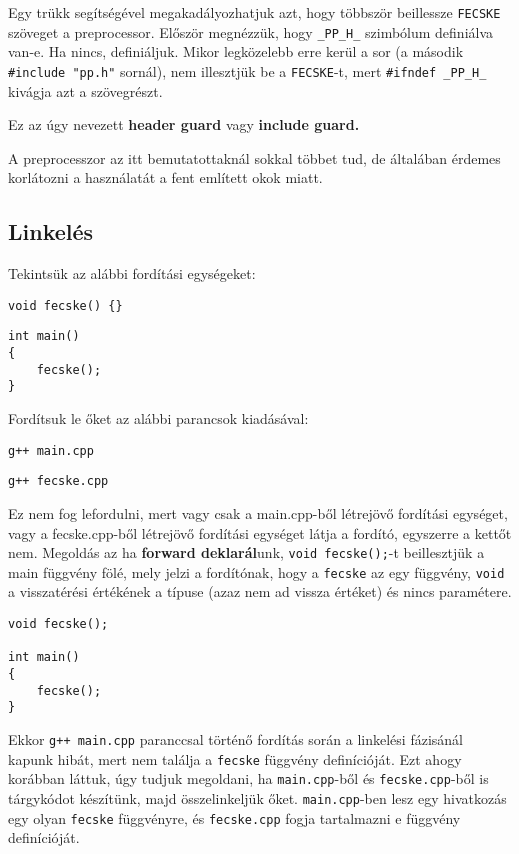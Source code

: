 \documentclass[a4paper,11.5pt,table]{article}
\begin{document}
	Egy trükk segítségével megakadályozhatjuk azt, hogy többször beillessze \texttt{FECSKE} szöveget a preprocessor. Először megnézzük, hogy \texttt{\_PP\_H\_} szimbólum definiálva van-e. Ha nincs, definiáljuk. Mikor legközelebb erre kerül a sor (a második \texttt{\#include "pp.h"} sornál), nem illesztjük be a \texttt{FECSKE}-t, mert \texttt{\#ifndef \_PP\_H\_} kivágja azt a szövegrészt.
	
	Ez az úgy nevezett \textbf{header guard} vagy \textbf{include guard.}
	
	\medskip
	A preprocesszor az itt bemutatottaknál sokkal többet tud, de általában érdemes korlátozni a használatát a fent említett okok miatt.
	
	\subsection{Linkelés}
	Tekintsük az alábbi fordítási egységeket:
	
	\smallskip
	\begin{lstlisting}
void fecske() {}
	\end{lstlisting}
	
	\smallskip
	\begin{lstlisting}
int main()
{
	fecske();
}
	\end{lstlisting}
	Fordítsuk le őket az alábbi parancsok kiadásával:
	
	{\centering\texttt{g++ main.cpp}\par}
	
	{\centering\texttt{g++ fecske.cpp}\par}
	
	Ez nem fog lefordulni, mert vagy csak a main.cpp-ből létrejövő fordítási egységet, vagy a fecske.cpp-ből létrejövő fordítási egységet látja a fordító, egyszerre a kettőt nem. Megoldás az ha \textbf{forward deklarál}unk, \texttt{void fecske();}-t beillesztjük a main függvény fölé, mely jelzi a fordítónak, hogy a \texttt{fecske} az egy függvény, \texttt{void} a visszatérési értékének a típuse (azaz nem ad vissza értéket) és nincs paramétere. 
	
	\smallskip
	\begin{lstlisting}
void fecske();

int main()
{
	fecske();
}
	\end{lstlisting}
	Ekkor \texttt{g++ main.cpp} paranccsal történő fordítás során a linkelési fázisánál kapunk hibát, mert nem találja a \texttt{fecske} függvény definícióját. Ezt ahogy korábban láttuk, úgy tudjuk megoldani, ha \texttt{main.cpp}-ből és \texttt{fecske.cpp}-ből is tárgykódot készítünk, majd összelinkeljük őket. \texttt{main.cpp}-ben lesz egy hivatkozás egy olyan \texttt{fecske} függvényre, és \texttt{fecske.cpp} fogja tartalmazni e függvény definícióját. 
		
\end{document}
